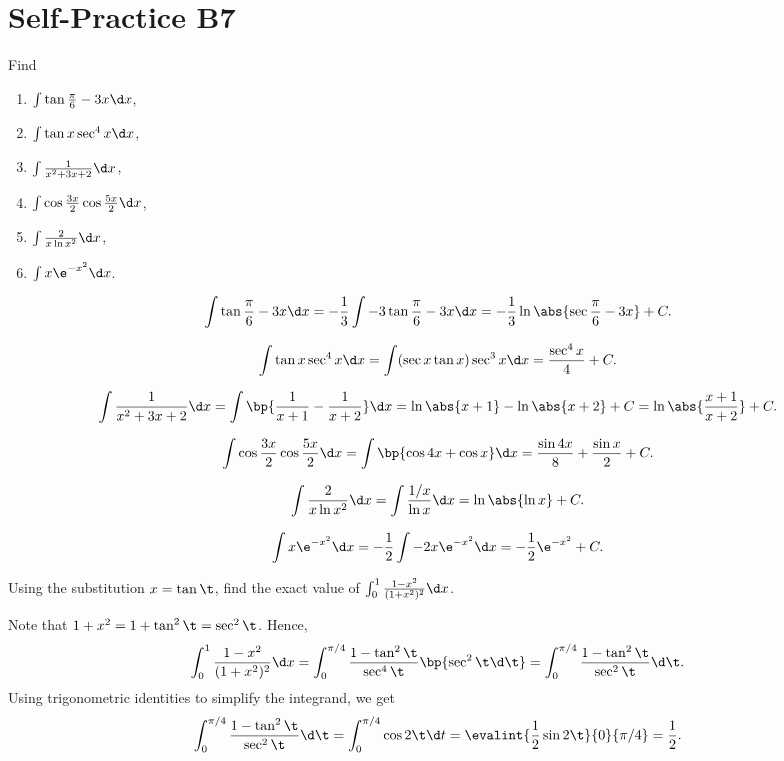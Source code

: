 \section{Self-Practice B7}

\begin{problem}
    Find
    \begin{enumerate}
        \item $\int \tan{\frac\pi6 - 3x} \d x$,
        \item $\int \tan x \sec^4 x \d x$,
        \item $\int \frac1{x^2 + 3x + 2} \d x$,
        \item $\int \cos \frac{3x}{2} \cos \frac{5x}{2} \d x$,
        \item $\int \frac2{x \ln x^2} \d x$,
        \item $\int x \e^{-x^2} \d x$.
    \end{enumerate}
\end{problem}
\begin{solution}
    \begin{ppart}
        \[\int \tan{\frac\pi6 - 3x} \d x = -\frac13 \int -3\tan{\frac\pi6 - 3x} \d x = -\frac13 \ln \abs{\sec{\frac\pi6 - 3x}} + C.\]
    \end{ppart}
    \begin{ppart}
        \[\int \tan x \sec^4 x \d x = \int (\sec x \tan x) \sec^3 x \d x = \frac{\sec^4 x}{4} + C.\]
    \end{ppart}
    \begin{ppart}
        \[\int \frac1{x^2 + 3x + 2} \d x = \int \bp{\frac1{x+1} - \frac1{x+2}} \d x = \ln \abs{x + 1} - \ln \abs{x + 2} + C = \ln \abs{\frac{x+1}{x+2}} + C.\]
    \end{ppart}
    \begin{ppart}
        \[\int \cos \frac{3x}{2} \cos \frac{5x}{2} \d x = \int \bp{\cos 4x + \cos x} \d x = \frac{\sin 4x}{8} + \frac{\sin x}{2} + C.\]
    \end{ppart}
    \begin{ppart}
        \[\int \frac2{x \ln x^2} \d x = \int \frac{1/x}{\ln x} \d x = \ln \abs{\ln x} + C.\]
    \end{ppart}
    \begin{ppart}
        \[\int x \e^{-x^2} \d x = -\frac12 \int -2x \e^{-x^2} \d x = -\frac12 \e^{-x^2} + C.\]
    \end{ppart}
\end{solution}

\begin{problem}
    Using the substitution $x = \tan \t$, find the exact value of $\int_0^1 \frac{1 - x^2}{(1 + x^2)^2} \d x$.
\end{problem}
\begin{solution}
    Note that $1 + x^2 = 1 + \tan^2 \t = \sec^2 \t$. Hence, \[\int_0^1 \frac{1 - x^2}{(1 + x^2)^2} \d x = \int_0^{\pi/4} \frac{1 - \tan^2 \t}{\sec^4 \t} \bp{\sec^2 \t \d \t} = \int_0^{\pi/4} \frac{1 - \tan^2 \t}{\sec^2 \t} \d \t.\] Using trigonometric identities to simplify the integrand, we get \[\int_0^{\pi/4} \frac{1 - \tan^2 \t}{\sec^2 \t} \d \t = \int_0^{\pi/4} \cos 2\t \d t = \evalint{\frac12 \sin 2\t}{0}{\pi/4} = \frac12.\]
\end{solution}


